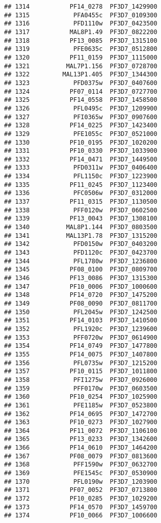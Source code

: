 \documentclass{article}\usepackage[]{graphicx}\usepackage[]{color}
\makeatletter
\newenvironment{kframe}{%
 \def\at@end@of@kframe{}%
 \ifinner\ifhmode%
  \def\at@end@of@kframe{\end{minipage}}%
  \begin{minipage}{\columnwidth}%
 \fi\fi%
 \def\FrameCommand##1{\hskip\@totalleftmargin \hskip-\fboxsep
 \colorbox{shadecolor}{##1}\hskip-\fboxsep
     \hskip-\linewidth \hskip-\@totalleftmargin \hskip\columnwidth}%
 \MakeFramed {\advance\hsize-\width
   \@totalleftmargin\z@ \linewidth\hsize
   \@setminipage}}%
 {\par\unskip\endMakeFramed%
 \at@end@of@kframe}
\newenvironment{knitrout}{}{} %
\makeatother
\begin{document}
\begin{knitrout}
\begin{kframe}
\begin{verbatim}
## 1314           PF14_0278  PF3D7_1429900
## 1315            PFA0455c  PF3D7_0109300
## 1316            PFD1110w  PF3D7_0423500
## 1317           MAL8P1.49  PF3D7_0822200
## 1318           PF13_0085  PF3D7_1315100
## 1319            PFE0635c  PF3D7_0512800
## 1320           PF11_0159  PF3D7_1115000
## 1321          MAL7P1.156  PF3D7_0728700
## 1322         MAL13P1.405  PF3D7_1344300
## 1323            PFD0375w  PF3D7_0407600
## 1324           PF07_0114  PF3D7_0727700
## 1325           PF14_0558  PF3D7_1458500
## 1326            PFL0495c  PF3D7_1209900
## 1327            PFI0365w  PF3D7_0907600
## 1328           PF14_0225  PF3D7_1423400
## 1329            PFE1055c  PF3D7_0521000
## 1330           PF10_0195  PF3D7_1020200
## 1331           PF10_0330  PF3D7_1033900
## 1332           PF14_0471  PF3D7_1449500
## 1333            PFD0311w  PF3D7_0406400
## 1334            PFL1150c  PF3D7_1223900
## 1335           PF11_0245  PF3D7_1123400
## 1336            PFC0506w  PF3D7_0312000
## 1337           PF11_0315  PF3D7_1130500
## 1338            PFF0120w  PF3D7_0602500
## 1339           PF13_0043  PF3D7_1308100
## 1340          MAL8P1.144  PF3D7_0803500
## 1341          MAL13P1.78  PF3D7_1315200
## 1342            PFD0150w  PF3D7_0403200
## 1343            PFD1120c  PF3D7_0423700
## 1344            PFL1780w  PF3D7_1236800
## 1345           PF08_0100  PF3D7_0809700
## 1346           PF13_0086  PF3D7_1315300
## 1347           PF10_0006  PF3D7_1000600
## 1348           PF14_0720  PF3D7_1475200
## 1349           PF08_0090  PF3D7_0811700
## 1350            PFL2045w  PF3D7_1242500
## 1351           PF14_0103  PF3D7_1410500
## 1352            PFL1920c  PF3D7_1239600
## 1353            PFF0720w  PF3D7_0614900
## 1354           PF14_0749  PF3D7_1477800
## 1355           PF14_0075  PF3D7_1407800
## 1356            PFL0735w  PF3D7_1215200
## 1357           PF10_0115  PF3D7_1011800
## 1358            PFI1275w  PF3D7_0926000
## 1359            PFF0170w  PF3D7_0603500
## 1360           PF10_0254  PF3D7_1025900
## 1361            PFE1185w  PF3D7_0523800
## 1362           PF14_0695  PF3D7_1472700
## 1363           PF10_0273  PF3D7_1027900
## 1364           PF11_0072  PF3D7_1106100
## 1365           PF13_0233  PF3D7_1342600
## 1366           PF14_0610  PF3D7_1464200
## 1367           PF08_0079  PF3D7_0813600
## 1368            PFF1590w  PF3D7_0632700
## 1369            PFE1545c  PF3D7_0530900
## 1370            PFL0190w  PF3D7_1203900
## 1371           PF07_0052  PF3D7_0713800
## 1372           PF10_0285  PF3D7_1029200
## 1373           PF14_0570  PF3D7_1459700
## 1374           PF10_0066  PF3D7_1006600

\end{verbatim}
\end{kframe}
\end{knitrout}
\end{document}
